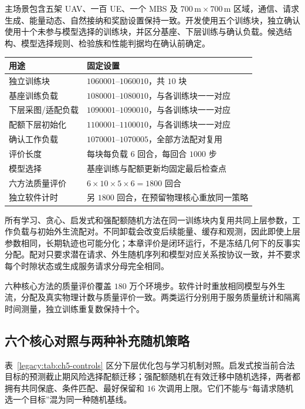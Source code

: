 主场景包含五架 UAV、一百 UE、一个 MBS 及 $700\,\mathrm{m}\times700\,\mathrm{m}$ 区域，通信、请求生成、能量动态、自然接纳和奖励设置保持一致。开发使用五个训练块，独立确认使用十个未参与模型选择的训练块，并区分基座、下层训练与确认负载。候选结构、模型选择规则、检验族和性能判据均在确认前确定。

\begin{table}[!htbp]
 \centering
 \label{legacy:tab:ch5-seeds}
 \begin{tabular}{lp{}}
  \toprule
  用途 & 固定设置 \\
  \midrule
  独立训练块 & $1060001$--$1060010$，共 $10$ 块 \\
  基座训练负载 & $1080001$--$1080010$，与各训练块一一对应 \\
  下层采图/适配负载 & $1090001$--$1090010$，与各训练块一一对应 \\
  配额下层初始化 & $1100001$--$1100010$，与各训练块一一对应 \\
  确认工作负载 & $1070001$--$1070005$，全部方法配对复用 \\
  评价长度 & 每块每负载 $6$ 回合，每回合 $1000$ 步 \\
  模型选择 & 基座训练与配额更新均固定最后检查点 \\
  六方法质量评价 & $6\times10\times5\times6=1800$ 回合 \\
  独立软件计时 & 另 $1800$ 回合，在预留物理核心重放同一策略 \\
  \bottomrule
 \end{tabular}
\end{table}

所有学习、贪心、启发式和强配额随机方法在同一训练块内复用共同上层参数，工作负载与初始外生流配对。不同卸载会改变后续能量、缓存和观测，因此即使上层参数相同，长期轨迹也可能分化；本章评价是闭环运行，不是冻结几何下的反事实分配。配对只要求潜在请求、外生随机序列和模型对应关系按协议一致，并不要求每个时隙状态或生成服务请求分母完全相同。

六种核心方法的质量评价覆盖 $180$ 万个环境步。软件计时重放相同模型与外生流，分配及真实物理计数与质量评价一致。两类运行分别用于服务质量统计和隔离时间测量，独立训练重复数保持十个。

\subsection{六个核心对照与两种补充随机策略}

表~\ref{legacy:tab:ch5-controls} 区分下层优化包与学习机制对照。启发式按当前合法目标的预测截止期风险选择配额迁移；强配额随机在有效迁移中随机选择，两者都拥有共同保底、条件匹配、最好保留和 $16$ 次调用上限。它们不能与“每请求随机选一个目标”混为同一种随机基线。

